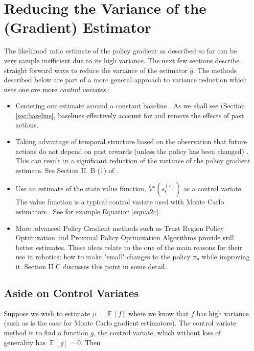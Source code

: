 \documentclass[11pt, oneside]{article}   	%
\DeclareMathOperator{\E}{\mathbb{E}}
\begin{document}
\section{Reducing the Variance of the (Gradient) Estimator}
\label{sec:variance}
The likelihood ratio estimate of the policy gradient as described so far can be very sample inefficient due to its high variance. The next few sections describe straight forward ways to 
reduce the variance of the estimator $\hat{g}$. The methods described below are part of a more general approach to variance reduction which uses one ore more \emph{control variates} 
\cite{szechtman2003}:
\begin{itemize}
\item Centering our estimate around a constant baseline \cite{Williams1992}. As we shall see (Section \ref{sec:baseline}, baselines effectively account for and remove the effects of past actions.
\item Taking advantage of temporal structure based on the observation that future actions do not depend on past rewards (unless the policy has been changed) . This can result in a significant 
reduction of the variance of the policy gradient estimate. See Section II. B (1) of \cite{Peters:2006fk}.
\item Use an estimate of the state value function, $V^{\pi}(s^{(i)}_t)$ as a control variate. The value function is a typical control variate used
with Monte Carlo estimators \cite{Greensmith:2004:VRT:1005332.1044710}.  See for example Equation \ref{eqn:a2c}.
\item More advanced Policy Gradient methods such as Trust Region Policy Optimization \cite{DBLP:journals/corr/SchulmanLMJA15} and Proximal Policy Optimization Algorithms \cite{2017arXiv170706347S} 
provide still better estimates. These ideas relate to the one of the main reasons for their use in robotics: how to make "small" changes to the policy $\pi_\theta$ while improving it.  
Section II C \cite{Peters:2006fk} discusses this point in some detail. 
\end{itemize}

\subsection{Aside on Control Variates}
\label{sec:control_variates}
Suppose we wish to estimate $\mu = \E[f]$ where we know that $f$ has high variance (such as is the case for Monte Carlo gradient estimators). 
The control variate method is to find a function $g$, the control variate, which without loss of generality has $\E[g] = 0$. Then
\end{document}

